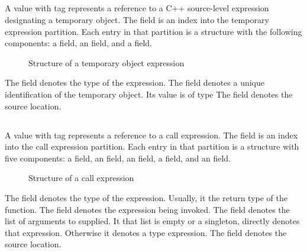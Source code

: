
\subsection{}
\label{sec:ifc:ExprSort:Temporary}

A  value with tag  represents a
reference to a C++ source-level expression designating a temporary object.
The  field is an index into the temporary expression partition.
Each entry in that partition is a structure with the following components: a  field, an  field, and a  field.
%
\begin{figure}[H]
	\centering
	\caption{Structure of a temporary object expression}
	\label{fig:ifc-temporary-expression-structure}
\end{figure}
%
The  field denotes the type of the expression.
The  field denotes a unique identification of the temporary object.
Its value is of type 
The  field denotes the source location.


\subsection{}
\label{sec:ifc:ExprSort:Call}

A  value with tag  represents
a reference to a call expression.
The  field is an index into the call expression partition.
Each entry in that partition is a structure with five components: a  field, an  field, an  field,
a  field, and an  field.
%
\begin{figure}[H]
	\centering
	\caption{Structure of a call expression}
	\label{fig:ifc-call-expression-structure}
\end{figure}
%
The  field denotes the type of the expression.  Usually, it the return type of the function.
The  field denotes the expression being invoked.
The  field denotes the list of arguments to supplied. It that list is empty or a singleton,  directly denotes that expression.
Otherwise it denotes a type expression.
The  field denotes the source location.

